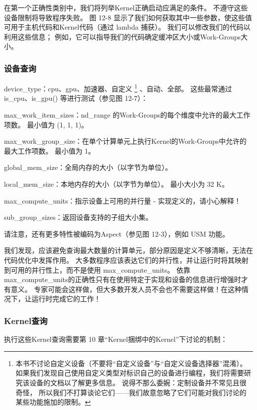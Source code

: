 在第一个正确性类别中，我们将列举Kernel正确启动应满足的条件。 不遵守这些设备限制将导致程序失败。 
图 12-8 显示了我们如何获取其中一些参数，使这些值可用于主机代码和Kernel代码（通过 lambda 捕获）。 
我们可以修改我们的代码以利用这些信息； 例如，它可以指导我们的代码确定缓冲区大小或Work-Groups大小。

\subsubsection{设备查询}
device\_type：cpu、gpu、加速器、自定义
\footnote{本书不讨论自定义设备（不要将“自定义设备”与“自定义设备选择器”混淆）。
如果我们发现自己使用自定义类型对标识自己的设备进行编程，我们将需要研究该设备的文档以了解更多信息。
说得不那么委婉：定制设备并不常见且很奇怪，
所以我们不打算谈论它们——我们故意忽略了它们可能对我们讨论的某些功能施加的限制。}
、自动、全部。 
这些最常通过 is\_cpu、is\_gpu() 等进行测试（参见图 12-7）：

max\_work\_item\_sizes：nd\_range 的Work-Groups的每个维度中允许的最大工作项数。 最小值为 (1, 1, 1)。

max\_work\_group\_size：在单个计算单元上执行Kernel的Work-Groups中允许的最大工作项数。 最小值为 1。

global\_mem\_size：全局内存的大小（以字节为单位）。

local\_mem\_size：本地内存的大小（以字节为单位）。 最小大小为 32 K。

max\_compute\_units：指示设备上可用的并行量 - 实现定义的，请小心解释！

sub\_group\_sizes：返回设备支持的子组大小集。

请注意，还有更多特性被编码为Aspect（参见图 12-3），例如 USM 功能。

\begin{remark}
我们发现，应该避免查询最大数量的计算单元，部分原因是定义不够清晰，无法在代码优化中发挥作用。
大多数程序应该表达它们的并行性，并让运行时将其映射到可用的并行性上，而不是使用 max\_compute\_units。
依靠max\_compute\_units的正确性只有在使用特定于实现和设备的信息进行增强时才有意义。
专家可能会这样做，但大多数开发人员不会也不需要这样做！在这种情况下，让运行时完成它的工作！
\end{remark}

\subsubsection{Kernel查询}
执行这些Kernel查询需要第 10 章“Kernel捆绑中的Kernel”下讨论的机制：

